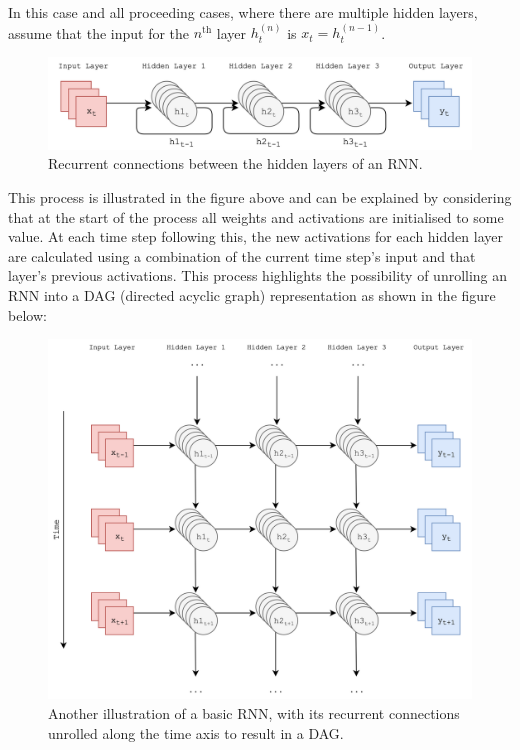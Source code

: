 \documentclass[12pt,]{article}
\begin{document}
In this case and all proceeding cases, where there are multiple hidden
layers, assume that the input for the \(n^{\text{th}}\) layer
\(h^{(n)}_t\) is \(x_t = h^{(n-1)}_t\).

\begin{figure}
\centering
\includegraphics{Images/rnn.png}
\caption{Recurrent connections between the hidden layers of an RNN.}
\end{figure}

This process is illustrated in the figure above and can be explained by
considering that at the start of the process all weights and activations
are initialised to some value. At each time step following this, the new
activations for each hidden layer are calculated using a combination of
the current time step's input and that layer's previous activations.
This process highlights the possibility of unrolling an RNN into a DAG
(directed acyclic graph) representation as shown in the figure below:

\begin{figure}
\centering
\includegraphics{Images/unrolledrnn.png}
\caption{Another illustration of a basic RNN, with its recurrent
connections unrolled along the time axis to result in a DAG.}
\end{figure}
\end{document}
